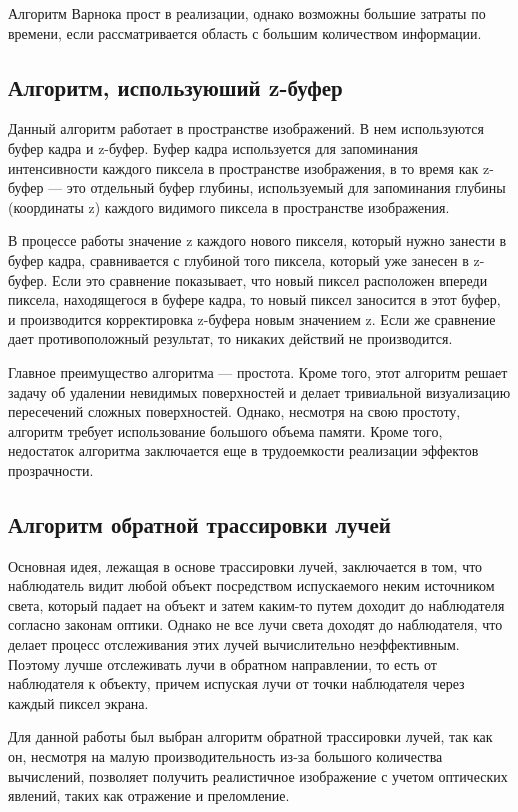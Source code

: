 Алгоритм Варнока прост в реализации, однако возможны большие затраты по
времени, если рассматривается область с большим количеством информации.

\subsection{Алгоритм, используюший z-буфер}

Данный алгоритм работает в пространстве изображений. В нем
используются буфер кадра и z-буфер. Буфер кадра используется для запоминания
интенсивности каждого пиксела в пространстве изображения, в то время как z-
буфер — это отдельный буфер глубины, используемый для запоминания глубины
(координаты z) каждого видимого пиксела в пространстве изображения.

В процессе работы значение z каждого нового пикселя, который нужно
занести в буфер кадра, сравнивается с глубиной того пиксела, который уже занесен
в z-буфер. Если это сравнение показывает, что новый пиксел расположен впереди
пиксела, находящегося в буфере кадра, то новый пиксел заносится в этот буфер, и
производится корректировка z-буфера новым значением z. Если же сравнение дает
противоположный результат, то никаких действий не производится.

Главное преимущество алгоритма — простота. Кроме того, этот алгоритм
решает задачу об удалении невидимых поверхностей и делает тривиальной
визуализацию пересечений сложных поверхностей. Однако, несмотря на свою
простоту, алгоритм требует использование большого объема памяти. Кроме того,
недостаток алгоритма заключается еще в трудоемкости реализации эффектов
прозрачности.

\subsection{Алгоритм обратной трассировки лучей}

Основная идея, лежащая в основе трассировки лучей, заключается в том, что
наблюдатель видит любой объект посредством испускаемого неким источником
света, который падает на объект и затем каким-то путем доходит до наблюдателя
согласно законам оптики. Однако не все лучи света доходят до наблюдателя, что
делает процесс отслеживания этих лучей вычислительно неэффективным.
Поэтому лучше отслеживать лучи в обратном направлении, то есть от наблюдателя
к объекту, причем испуская лучи от точки наблюдателя через каждый пиксел
экрана.

Для данной работы был выбран алгоритм обратной трассировки лучей, так
как он, несмотря на малую производительность из-за большого количества
вычислений, позволяет получить реалистичное изображение с учетом оптических
явлений, таких как отражение и преломление.

